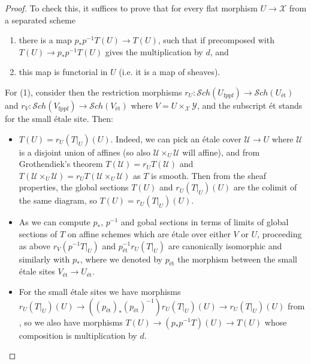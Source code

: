 \documentclass{amsart}
\theoremstyle{definition}
\newcommand{\cX}{\mathcal{X}}
\newcommand{\cU}{\mathcal{U}}
\newcommand{\cY}{\mathcal{Y}}
\newcommand{\cS}{\mathcal{S}}
\newcommand{\fppf}{\operatorname{fppf}}
\begin{document}
\begin{proof}
 To check this, it suffices to prove that for every flat morphism $U\to \cX$ from a separated scheme
 \begin{enumerate}
     \item there is a map $p_*p^{-1}T(U)\to T(U)$, such that if precomposed with $T(U)\to p_*p^{-1}T(U)$ gives the multiplication by $d$, and
     \item this map is functorial in $U$ (i.e. it is a map of sheaves).
 \end{enumerate}
 For (1), consider then the restriction morphisms $r_U\colon \cS ch(U_{\fppf})\to \cS ch(U_{\text{\'et}})$ and $r_V\colon \cS ch(V_{\fppf})\to \cS ch(V_{\text{\'et}})$ where $V=U\times_\cX\cY$,
 and the subscript \'et stands for the small
 \'etale site. Then:
 \begin{itemize}
     \item $T(U)=r_U(T|_U)(U)$. Indeed, we can pick an \'etale cover $\cU\to U$ where $\cU$ is a disjoint union of affines (so also $\cU\times_U\cU$ will affine), and from Grothendiek's theorem \cite[Theorem 11.7]{MR244270} $T(\cU)= r_UT(\cU)$ and $T(\cU\times_U\cU)= r_UT(\cU\times_U\cU)$ as $T$ is smooth. Then from the sheaf properties, the global sections $T(U)$ and $r_U(T|_U)(U)$ are the colimit of the same diagram, so $T(U)=r_U(T|_U)(U)$.
     \item As we can compute $p_*$, $p^{-1}$ and gobal sections in terms of limits of global sections of $T$ on affine schemes which are \'etale over either $V$ or $U$, proceeding as above $r_V(p^{-1}T|_U)$ and $ p^{-1}_{\text{\'et}}r_U(T|_U)$ are canonically isomorphic and similarly with $p_*$, where we denoted by $p_{\text{\'et}}$ the morphism between the small \'etale sites $V_{\text{\'et}}\to U_{\text{\'et}}$.
     \item For the small \'etale sites we have morphisms
 $r_U(T|_U)(U)\to ((p_{\text{\'et}})_*(p_{\text{\'et}})^{-1})r_U(T|_U)(U)\to r_U(T|_U)(U)$ from \cite[\href{https://stacks.math.columbia.edu/tag/03SH}{Tag 03SH}]{stacks-project}, so we also have morphisms $T(U)\to (p_*p^{-1}T) (U)\to T(U)$ whose composition is multiplication by $d$.
 \end{itemize}


\end{proof}
\end{document}
